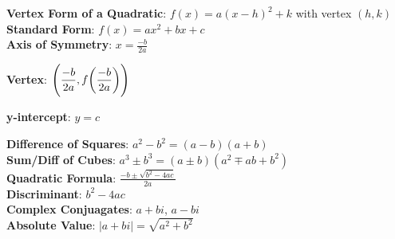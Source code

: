 \documentclass{report}
\theoremstyle{definition}
\begin{document}
\begin{minipage}[t]{0.45\linewidth}
\textbf{Vertex Form of a Quadratic}:  $f(x)=a(x-h)^2+k$ with vertex $(h,k)$\\

\textbf{Standard Form}: $f(x)=ax^2+bx+c$\\

\textbf{Axis of Symmetry}: $\displaystyle x=\frac{-b}{2a}$\\

\vspace{0.175cm}

\textbf{Vertex}: $\displaystyle\Bigg{(} \frac{-b}{2a}, f\bigg{(} \frac{-b}{2a} \bigg{)} \Bigg{)}$

\vspace{0.175cm}

\textbf{y-intercept}: $y=c$\\
\end{minipage}
\hfill
\begin{minipage}[t]{0.45\linewidth}
\textbf{Difference of Squares}: $a^2-b^2=(a-b)(a+b)$\\

\textbf{Sum/Diff of Cubes}: $a^3\pm b^3 = (a\pm b)(a^2\mp ab +b^2)$\\

\textbf{Quadratic Formula}: $\displaystyle\frac{-b\pm\sqrt{b^2-4ac}}{2a}$\\

\textbf{Discriminant}: $b^2-4ac$ \\

\textbf{Complex Conjuagates}: $a+bi$, $a-bi$\\

\textbf{Absolute Value}: $|a+bi|=\sqrt{a^2+b^2}$
\end{minipage}


\vspace{-0.75cm}
\end{document}
